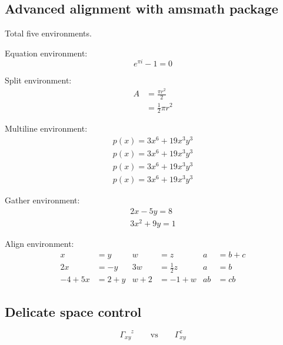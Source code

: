 \documentclass[12pt, oneside]{article}
\begin{document}
\subsection{Advanced alignment with amsmath package}
Total five environments.

Equation environment:
\begin{equation} 
e^{\pi i} - 1 = 0
\end{equation}

Split environment:
\begin{equation}
\begin{split}
A & = \frac{\pi r^2}{2} \\
   & = \frac{1}{2} \pi r^2
\end{split}
\end{equation}

Multiline environment:
\begin{multline*}
p(x) = 3x^6 + 19x^3y^3 \\ 
p(x) = 3x^6 + 19x^3y^3 \\
p(x) = 3x^6 + 19x^3y^3 \\
p(x) = 3x^6 + 19x^3y^3
\end{multline*}

Gather environment:
\begin{gather*} 
2x - 5y = 8 \\ 
3x^2 + 9y = 1
\end{gather*}

Align environment:
\begin{align*}
x          &= y       &  w      &= z                 &  a  &= b + c \\ 
2x        &= -y      &  3w    &= \frac{1}{2}z &  a  &= b       \\
-4 + 5x &= 2 + y & w + 2 &= -1 + w        &  ab &= cb
\end{align*}



\subsection{Delicate space control}
\begin{displaymath}
\Gamma_{xy}^{\phantom{xy}z}
\qquad \textrm{vs} \qquad
\Gamma_{xy}^{z}
\end{displaymath}
\end{document}
